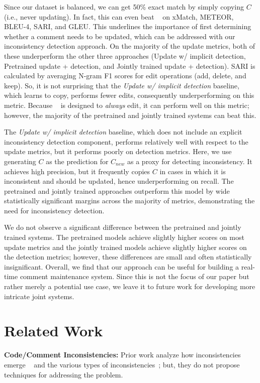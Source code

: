 \documentclass[letterpaper]{article} %
\newcommand{\Comment}{$C$}
\newcommand{\NewComment}{$C_{new}$}
\newcommand{\UpdateCopy}{Update w/ implicit detection}
\newcommand{\Pretrained}{Pretrained update + detection}
\newcommand{\JointlyTrained}{Jointly trained update + detection}
\begin{document}
Since our dataset is balanced, we can get 50\% exact match by simply copying \Comment{} (i.e., never updating). In fact, this can even beat \citeauthor{panthaplackel2020update}~ on xMatch, METEOR, BLEU-4, SARI, and GLEU. This underlines the importance of first determining whether a comment needs to be updated, which can be addressed with our inconsistency detection approach. On the  majority of the update metrics, both of these underperform the other three approaches (\UpdateCopy{}, \Pretrained{}, and \JointlyTrained{}). SARI is calculated by averaging N-gram F1 scores for edit operations (add, delete, and keep). So, it is not surprising that the \textit{\UpdateCopy{}} baseline, which learns to copy, performs fewer edits, consequently underperforming on this metric. Because \citeauthor{panthaplackel2020update}~ is designed to \textit{always} edit, it can perform well on this metric; however, the majority of the pretrained and jointly trained systems can beat this.

The \textit{\UpdateCopy{}} baseline, which does not include an explicit inconsistency detection component, performs relatively well with respect to the update metrics, but it performs poorly on detection metrics. Here, we use generating \Comment{} as the prediction for \NewComment{} as a proxy for detecting inconsistency. It achieves high precision, but it frequently copies \Comment{} in cases in which it is inconsistent and should be updated, hence underperforming on recall. The pretrained and jointly trained approaches outperform this model by wide statistically significant margins across the majority of metrics, demonstrating the need for inconsistency detection.

We do not observe a significant difference between the pretrained and jointly trained systems. The pretrained models achieve slightly higher scores on most update metrics and the jointly trained models achieve slightly higher scores on the detection metrics; however, these differences are small and often statistically insignificant. Overall, we find that our approach can be useful for building a real-time comment maintenance system. Since this is not the focus of our paper but rather merely a potential use case,  we leave it to future work for developing more intricate joint systems.




\section{Related Work}
\noindent\textbf{Code/Comment Inconsistencies:}
Prior work analyze how inconsistencies emerge ~\cite{FluriAnalysis,JiangEvolution,IbrahimBugs,fluri:coevolve} and the various types of inconsistencies~\cite{WenLargeStudy}; but, they do not propose techniques for addressing the problem.
\end{document}
